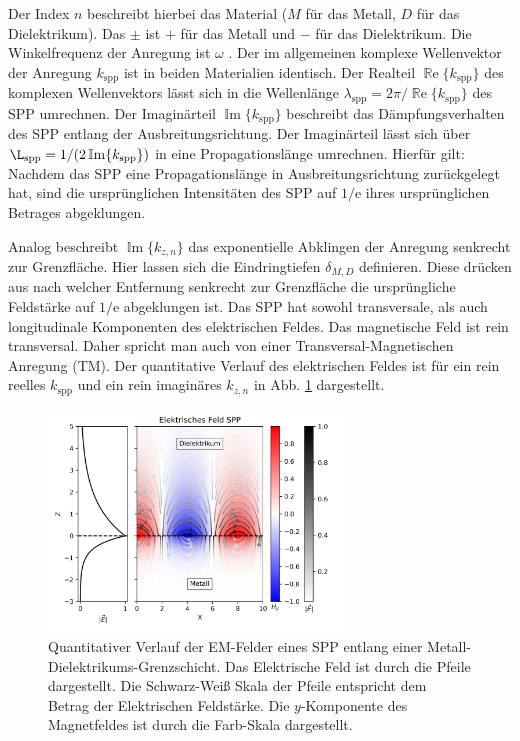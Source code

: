 \documentclass[titlepage]{article}
\renewcommand{\Re}{\operatorname{\mathbb{R}e}}
\begin{document}
	Der Index $n$ beschreibt hierbei das Material ($M$ für das Metall, $D$ für das Dielektrikum). Das $\pm$ ist $+$ für das Metall und  $-$ für das Dielektrikum. Die Winkelfrequenz der Anregung ist $\omega$ . Der im allgemeinen komplexe Wellenvektor der Anregung $k_{\mathrm{spp}}$ ist in beiden Materialien identisch. Der Realteil $\Re\{k_{\mathrm{spp}}\}$ des komplexen Wellenvektors lässt sich in die Wellenlänge $\lambda_{\mathrm{spp}} = 2\pi/ \Re\{k_{\mathrm{spp}}\} $ des SPP umrechnen. Der Imaginärteil $\operatorname{\mathbb{I}m}\{k_{\mathrm{spp}}\}$ beschreibt das Dämpfungsverhalten des SPP entlang der Ausbreitungsrichtung. Der Imaginärteil lässt sich über $\L_{\mathrm{spp}} = 1/(2\operatorname{\mathbb{I}m}\{k_{\mathrm{spp}}\})$ in eine Propagationslänge umrechnen.  Hierfür gilt: Nachdem das SPP eine Propagationslänge in Ausbreitungsrichtung zurückgelegt hat, sind die ursprünglichen Intensitäten des SPP auf $1/\mathrm{e}$ ihres ursprünglichen Betrages abgeklungen.
	
	Analog beschreibt $\operatorname{\mathbb{I}m}\{k_{z, n}\}$ das exponentielle Abklingen der Anregung senkrecht zur Grenzfläche. Hier lassen sich die Eindringtiefen $\delta_{M,D}$ definieren. Diese drücken aus nach welcher Entfernung senkrecht zur Grenzfläche die ursprüngliche Feldstärke auf $1/\mathrm{e}$ abgeklungen ist. Das SPP hat sowohl transversale, als auch longitudinale Komponenten des elektrischen Feldes. Das magnetische Feld ist rein transversal. Daher spricht man auch von einer Transversal-Magnetischen Anregung (TM).
	Der quantitative Verlauf des elektrischen Feldes ist für ein rein reelles $k_{\mathrm{spp}}$ und ein rein imaginäres $k_{z, n}$ in Abb. \ref{fig:electric_field_spp} dargestellt.
	\begin{figure}[htbp] 
		\centering
		\includegraphics[width=0.7\textwidth]{figures/E_Feld_SPP.png}
		\caption{Quantitativer Verlauf der EM-Felder eines SPP entlang einer Metall-Dielektrikums-Grenzschicht. Das Elektrische Feld ist durch die Pfeile dargestellt. Die Schwarz-Weiß Skala der Pfeile entspricht dem Betrag der Elektrischen Feldstärke. Die $y$-Komponente des Magnetfeldes ist durch die Farb-Skala dargestellt.}
		\label{fig:electric_field_spp}
	\end{figure}
\end{document}
